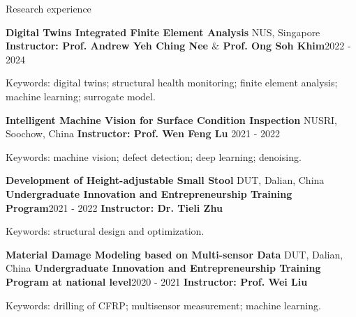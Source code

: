 \documentclass{resume} %
\begin{document}
\begin{rSection}{Research experience}
\begin{rSubsection}{\bf Digital Twins Integrated Finite Element Analysis  }{NUS, Singapore}
	{\bf Instructor: Prof. Andrew Yeh Ching Nee $\&$  Prof. Ong Soh Khim}{2022 - 2024}
	\item {Keywords: digital twins; structural health monitoring; finite element analysis; machine learning; surrogate model.}\\
\end{rSubsection}

\begin{rSubsection}{\bf Intelligent Machine Vision for Surface Condition Inspection  }{NUSRI, Soochow, China}
{\bf Instructor: Prof. Wen Feng Lu  }{2021 - 2022}
	\item {Keywords: machine vision; defect detection; deep learning; denoising.}\\
\end{rSubsection}

\begin{rSubsubsection}{\bf Development of Height-adjustable Small Stool  }{DUT, Dalian, China}
{\bf Undergraduate Innovation and Entrepreneurship Training Program}{2021 - 2022}
{\bf Instructor: Dr. Tieli Zhu}{ }
	\item {Keywords: structural design and optimization.}\\
\end{rSubsubsection}


\begin{rSubsubsection}{\bf Material Damage Modeling based on Multi-sensor Data  }{DUT, Dalian, China}
	{\bf Undergraduate Innovation and Entrepreneurship Training Program at national level}{2020 - 2021}
	{\bf Instructor: Prof. Wei Liu}{ }
	\item {Keywords: drilling of CFRP; multisensor measurement; machine learning.}\\
\end{rSubsubsection}
\end{rSection}
\end{document}

